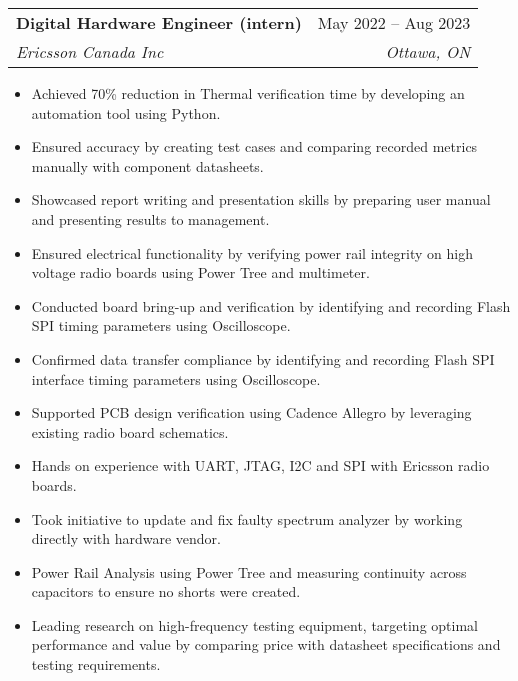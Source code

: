 \documentclass[A4,10pt]{article}
\makeatletter
\newcommand{\resumeItem}[1]{
  \item\small{
    {#1 \vspace{-2pt}}
  }
}
\newcommand{\resumeSubheading}[4]{
  \vspace{-2pt}\item
    \begin{tabular*}{0.97\textwidth}[t]{l@{\extracolsep{\fill}}r}
      \textbf{#1} & #2 \\
      \textit{\small#3} & \textit{\small #4} \\
    \end{tabular*}\vspace{-7pt}
}
\newcommand{\resumeSubSubheading}[2]{
    \item
    \begin{tabular*}{0.97\textwidth}{l@{\extracolsep{\fill}}r}
      \textit{\small#1} & \textit{\small #2} \\
    \end{tabular*}\vspace{-7pt}
}
\newcommand{\resumeSubHeadingListEnd}{\end{itemize}}
\newcommand{\resumeItemListStart}{\begin{itemize}}
\newcommand{\resumeItemListEnd}{\end{itemize}\vspace{-5pt}}
\makeatother
\begin{document}
    \resumeSubheading
      {Digital Hardware Engineer (intern)}{May 2022 -- Aug 2023}
      {Ericsson Canada Inc}{Ottawa, ON}
      \resumeItemListStart
        \resumeItem{Achieved 70\% reduction in Thermal verification time by developing an automation tool using Python.} %
        \resumeItem{Ensured accuracy by creating test cases and comparing recorded metrics manually with component datasheets.} %
        \resumeItem{Showcased report writing and presentation skills by preparing user manual and presenting results to management.} %
        \resumeItem{Ensured electrical functionality by verifying power rail integrity on high voltage radio boards using Power Tree and multimeter.} %
        \resumeItem{Conducted board bring-up and verification by identifying and recording Flash SPI timing parameters using Oscilloscope.} %
        \resumeItem{Confirmed data transfer compliance by identifying and recording Flash SPI interface timing parameters using Oscilloscope.}
        \resumeItem{Supported PCB design verification using Cadence Allegro by leveraging existing radio board schematics.} %
        \resumeItem{Hands on experience with UART, JTAG, I2C and SPI with Ericsson radio boards.} %
        \resumeItem{Took initiative to update and fix faulty spectrum analyzer by working directly with hardware vendor.}
        \resumeItem{Power Rail Analysis using Power Tree and measuring continuity across capacitors to ensure no shorts were created.}
        \resumeItem{Leading research on high-frequency testing equipment, targeting optimal performance and value by comparing price with datasheet specifications and testing requirements.}
      \resumeItemListEnd
      
\end{document}
